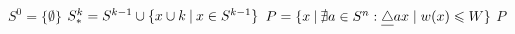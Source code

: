 \begin{algorithmic}[1] %
    \State $S^0 = \big\{\emptyset\big\}$
      \State $S_*^k = S^{k-1} \cup \{x \cup k \:|\: x \in S^{k-1}\}$
    \EndFor
  \State $P = \{x \:|\: \nexists a \in S^n: \underline{\triangle}{a}{x} \;|\; w(x) \leqslant W \}$
  \State \Return $P$
  \EndFunction
\end{algorithmic}
